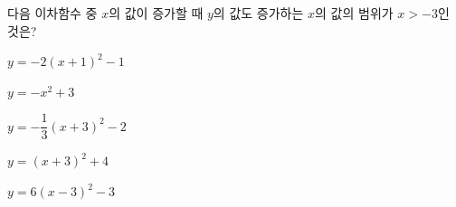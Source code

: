 다음 이차함수 중 $x$의 값이 증가할 때 $y$의 값도 증가하는 $x$의 값의 범위가 $x>-3$인 것은?
\begin{choicesii}{\rule[-3ex]{0pt}{8ex}$y=-2(x+1)^2-1$}{\rule[-3ex]{0pt}{8ex}$y=-x^2+3$}{\rule[-3ex]{0pt}{8ex}$y=-\dfrac{1}{3}(x+3)^2-2$}{\rule[-3ex]{0pt}{8ex}$y=(x+3)^2+4$}{\rule[-3ex]{0pt}{8ex}$y=6(x-3)^2-3$}\end{choicesii}
